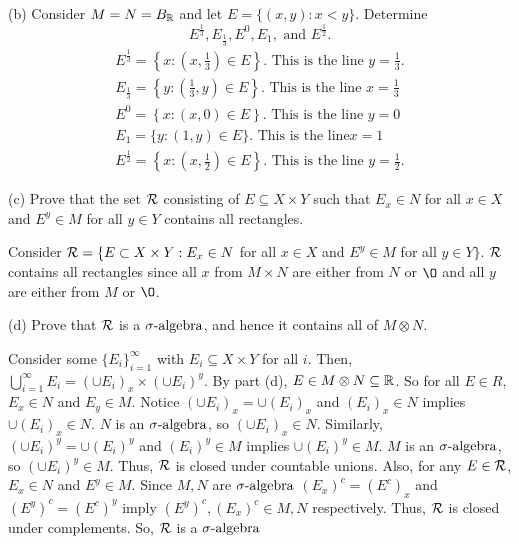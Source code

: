 \begin{enumerate}
\subsubitem(b) Consider $M=N=B_{\mathbb R}$ and let $E=\{(x,y) : x <y \}$. Determine 
\begin{equation*}
E^{\frac{1}{3}}, E_{\frac{1}{3}}	, E^0, E_1, \text{ and } E^{\frac{1}{2}}.
\end{equation*}
\begin{equation*}
\begin{multlined}
E^{\frac{1}{3}}=\left\lbrace x: \left(x, \frac{1}{3} \right) \in E \right\rbrace. \text{ This is the line } y=\frac{1}{3}. \\
E_{\frac{1}{3} } =\left\lbrace y: \left(\frac{1}{3}, y \right) \in E \right\rbrace. \text{ This is the line } x=\frac{1}{3}\\
E^0 = \left\lbrace x: (x, 0) \in E \right\rbrace. \text{ This is the line } y=0 \\
E_1= \{y : (1,y) \in E \}. \text{ This is the line}x=1 \\
E^{\frac{1}{2}}=\left\lbrace x: \left(x, \frac{1}{2} \right) \in E \right\rbrace. \text{ This is the line } y=\frac{1}{2}.
\end{multlined}
\end{equation*}

\subitem(c) Prove that the set ${\mathcal R}$ consisting of $E \subseteq X \times Y$ such that $E_x\in N$ for all $x \in X$ and $E^y \in M$ for all $y \in Y$ contains all rectangles. 
\begin{pf}
	 Consider ${\mathcal R} = \{ E \subset X \times Y: E_x \in N $ for all $x \in X$ and $E^y \in M $ for all $y \in Y\}$. ${\mathcal R}$ contains all rectangles since all $x$ from $M \times N$ are either from $N$ or $\O$ and all $y$ are either from $M$ or $\O$. 
\end{pf}

\subitem(d) Prove that ${\mathcal R}$ is a ${\sigma}\text{-algebra}$, and hence it contains all of $M \otimes N$.
\begin{pf}
	Consider some $\{E_i\}_{i=1}^\infty$ with $E_i \subseteq X \times Y$ for all $i$. Then, $\bigcup_{i=1}^\infty E_i = (\cup E_i)_x \times (\cup E_i)^y$. By part (d), $E \in M \otimes N \subseteq {\mathbb R}$. So for all $E \in R$, $E_x \in N$ and $E_y \in M$. Notice $(\cup E_i)_x=\cup(E_i)_x$ and $(E_i)_x \in N$ implies $\cup(E_i)_x \in N$. $N$ is an ${\sigma}\text{-algebra}$, so $(\cup E_i)_x \in N$. Similarly, $(\cup E_i)^y=\cup(E_i)^y$ and $(E_i)^y \in M$ implies $\cup(E_i)^y \in M$. $M$ is an ${\sigma}\text{-algebra}$, so $(\cup E_i)^y \in M$. Thus, ${\mathcal R}$ is closed under countable unions. Also, for any $E \in {\mathcal R}$, $E_x \in N$ and $E^y \in M$. Since $M, N$ are ${\sigma}\text{-algebra}$ $(E_x)^c = (E^c)_x$ and $(E^y)^c = (E^c)^y$ imply $(E^y)^c, (E_x)^c \in M, N$ respectively. Thus, ${\mathcal R}$ is closed under complements. So, ${\mathcal R}$ is a ${\sigma}\text{-algebra}$
\end{pf}
\end{enumerate}
